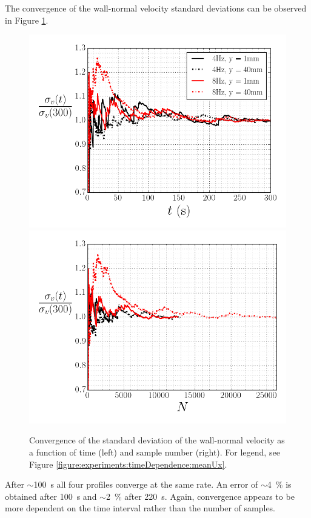 \documentclass[12pt,oneside,a4paper]{article}
\begin{document}
The convergence of the wall-normal velocity standard deviations can be observed in Figure \ref{figure:experiments:timeDependence:RMSuy}.
%
\begin{figure}[!h]
\centering
\includegraphics[width=0.5\linewidth]{images/LDA_timeDependenceImages/uyRMSTConvergence.png}\hfill
\includegraphics[width=0.5\linewidth]{images/LDA_timeDependenceImages/uyRMSNConvergence.png}\\
\caption{Convergence of the standard deviation of the wall-normal velocity as a function of time (left) and sample number (right). For legend, see Figure \ref{figure:experiments:timeDependence:meanUx}.}
\label{figure:experiments:timeDependence:RMSuy}
\end{figure}
%
After $\sim$\SI{100}{s} all four profiles converge at the same rate. An error of $\sim$\SI{4}{\%} is obtained after \SI{100}{s} and $\sim$\SI{2}{\%} after \SI{220}{s}. Again, convergence appears to be more dependent on the time interval rather than the number of samples.
\end{document}
